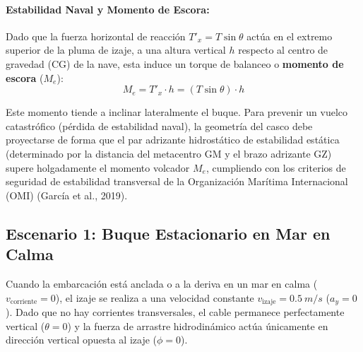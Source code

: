 \documentclass[11pt,a4paper]{article}
\begin{document}
\paragraph{Estabilidad Naval y Momento de Escora:}
Dado que la fuerza horizontal de reacción $T'_x = T\sin\theta$ actúa en el extremo superior de la pluma de izaje, a una altura vertical $h$ respecto al centro de gravedad (CG) de la nave, esta induce un torque de balanceo o \textbf{momento de escora} ($M_e$):
\begin{equation}\label{eq:momento_escora}
M_e = T'_x \cdot h = (T\sin\theta) \cdot h
\end{equation}

Este momento tiende a inclinar lateralmente el buque. Para prevenir un vuelco catastrófico (pérdida de estabilidad naval), la geometría del casco debe proyectarse de forma que el par adrizante hidrostático de estabilidad estática (determinado por la distancia del metacentro GM y el brazo adrizante GZ) supere holgadamente el momento volcador $M_e$, cumpliendo con los criterios de seguridad de estabilidad transversal de la Organización Marítima Internacional (OMI) (García et al., 2019).


\subsection{Escenario 1: Buque Estacionario en Mar en Calma}
Cuando la embarcación está anclada o a la deriva en un mar en calma ($v_{\text{corriente}} = 0$), el izaje se realiza a una velocidad constante $v_{\text{izaje}} = \SI{0.5}{m/s}$ ($a_y = 0$). Dado que no hay corrientes transversales, el cable permanece perfectamente vertical ($\theta = 0$) y la fuerza de arrastre hidrodinámico actúa únicamente en dirección vertical opuesta al izaje ($\phi = 0$).
\end{document}
